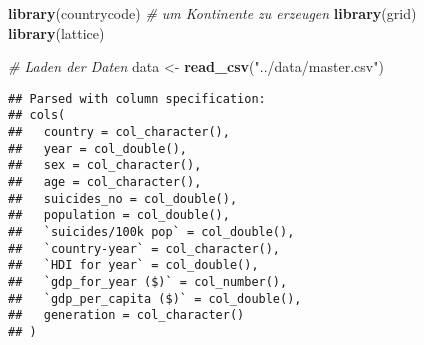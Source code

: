 \documentclass[]{article}
\newenvironment{Shaded}{\begin{snugshade}}{\end{snugshade}}
\newcommand{\CommentTok}[1]{\textcolor[rgb]{0.56,0.35,0.01}{\textit{#1}}}
\newcommand{\KeywordTok}[1]{\textcolor[rgb]{0.13,0.29,0.53}{\textbf{#1}}}
\newcommand{\NormalTok}[1]{#1}
\newcommand{\StringTok}[1]{\textcolor[rgb]{0.31,0.60,0.02}{#1}}
\begin{document}
\begin{Shaded}
\begin{Highlighting}[]
\KeywordTok{library}\NormalTok{(countrycode)   }\CommentTok{# um Kontinente zu erzeugen}
\KeywordTok{library}\NormalTok{(grid)}
\KeywordTok{library}\NormalTok{(lattice)}


\CommentTok{# Laden der Daten}
\NormalTok{data <-}\StringTok{ }\KeywordTok{read_csv}\NormalTok{(}\StringTok{"../data/master.csv"}\NormalTok{)}
\end{Highlighting}
\end{Shaded}

\begin{verbatim}
## Parsed with column specification:
## cols(
##   country = col_character(),
##   year = col_double(),
##   sex = col_character(),
##   age = col_character(),
##   suicides_no = col_double(),
##   population = col_double(),
##   `suicides/100k pop` = col_double(),
##   `country-year` = col_character(),
##   `HDI for year` = col_double(),
##   `gdp_for_year ($)` = col_number(),
##   `gdp_per_capita ($)` = col_double(),
##   generation = col_character()
## )
\end{verbatim}
\end{document}
